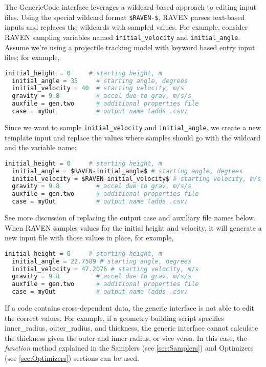The GenericCode interface leverages a wildcard-based approach to editing input files. Using the
special wildcard format \texttt{\$RAVEN-\$}, RAVEN parses text-based inputs and replaces the
wildcards with sampled values. For example, consider RAVEN sampling variables named
\texttt{initial\_velocity} and \texttt{initial\_angle}. Assume we're using a projectile tracking model
with keyword based entry input files; for example,
\begin{lstlisting}[language=python]
  initial_height = 0     # starting height, m
  initial_angle = 35     # starting angle, degrees
  initial_velocity = 40  # starting velocity, m/s
  gravity = 9.8          # accel due to grav, m/s/s
  auxfile = gen.two      # additional properties file
  case = myOut           # output name (adds .csv)
 \end{lstlisting}
Since we want to sample \texttt{initial\_velocity} and \texttt{initial\_angle}, we create a new
template input and replace the values where samples should go with the wildcard and the variable
name:
\begin{lstlisting}[language=python]
  initial_height = 0     # starting height, m
  initial_angle = $RAVEN-initial_angle$ # starting angle, degrees
  initial_velocity = $RAVEN-initial_velocity$ # starting velocity, m/s
  gravity = 9.8          # accel due to grav, m/s/s
  auxfile = gen.two      # additional properties file
  case = myOut           # output name (adds .csv)
\end{lstlisting}
See more discussion of replacing the output case and auxiliary file names below. When RAVEN samples
values for the initial height and velocity, it will generate a new input file with those values in
place, for example,
\begin{lstlisting}[language=python]
  initial_height = 0     # starting height, m
  initial_angle = 22.7589 # starting angle, degrees
  initial_velocity = 47.2076 # starting velocity, m/s
  gravity = 9.8          # accel due to grav, m/s/s
  auxfile = gen.two      # additional properties file
  case = myOut           # output name (adds .csv)
\end{lstlisting}

If a code contains cross-dependent data, the generic interface is not able to
edit the correct values.  For example, if a geometry-building script specifies
inner\_radius, outer\_radius, and thickness, the generic interface cannot
calculate the thickness given the outer and inner radius, or vice versa.
In this case, the \textit{function} method explained in the Samplers (see \ref{sec:Samplers})
and Optimizers (see \ref{sec:Optimizers}) sections can be used.

